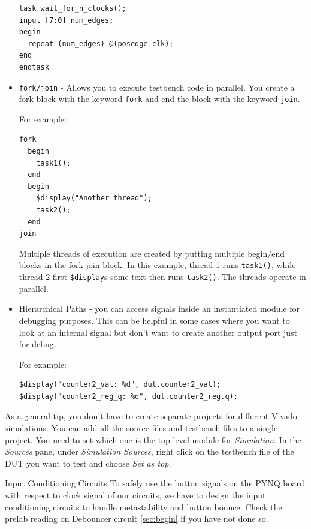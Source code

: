 \documentclass[11pt]{article}
\makeatletter
\renewcommand{\section}
{\@startsection {section}{1}{0pt}
 {-2ex}
 {1ex}
 {\bfseries\Large}}
\makeatother
\begin{document}
\begin{itemize}
\begin{verbatim}
task wait_for_n_clocks();
input [7:0] num_edges;
begin
  repeat (num_edges) @(posedge clk);
end
endtask
\end{verbatim}

\item \verb|fork/join| - Allows you to execute testbench code in parallel. You create a fork block with the keyword \verb|fork| and end the block with the keyword \verb|join|.

For example:
\begin{verbatim}
fork
  begin
    task1();
  end
  begin
    $display("Another thread");
    task2();
  end
join
\end{verbatim}

Multiple threads of execution are created by putting multiple begin/end blocks in the fork-join block.
In this example, thread 1 runs \verb|task1()|, while thread 2 first \verb|$display|s some text then runs \verb|task2()|.
The threads operate in parallel.

\item Hierarchical Paths - you can access signals inside an instantiated module for debugging purposes. This can be helpful in some cases where you want to look at an internal signal but don't want to create another output port just for debug.

For example:
\begin{verbatim}
$display("counter2_val: %d", dut.counter2_val);
$display("counter2_reg_q: %d", dut.counter2_reg.q);
\end{verbatim}
\end{itemize}

As a general tip, you don't have to create separate projects for different Vivado simulations. You can add all the source files and testbench files to a single project. You need to set which one is the top-level module for \emph{Simulation}. In the \emph{Sources} pane, under \emph{Simulation Sources}, right click on the testbench file of the DUT you want to test and choose \emph{Set as top}.

\section{Input Conditioning Circuits}
To safely use the button signals on the PYNQ board with respect to clock signal of our circuits, we have to design the input conditioning circuits to handle metastability and button bounce. Check the prelab reading on Debouncer circuit \ref{sec:begin} if you have not done so.
\end{document}
